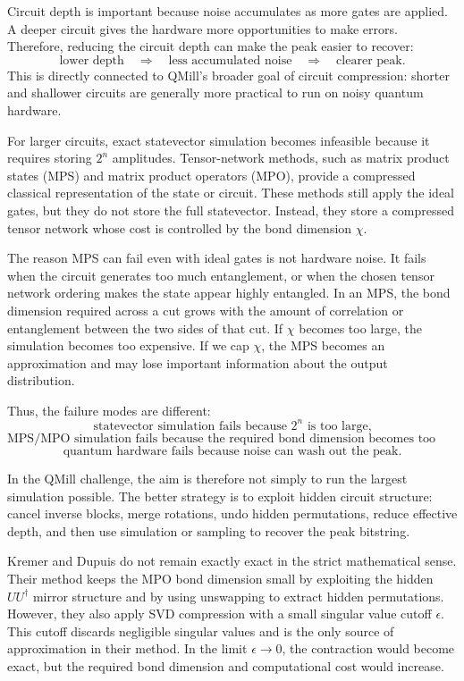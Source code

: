 Circuit depth is important because noise accumulates as more gates are applied.
A deeper circuit gives the hardware more opportunities to make errors. Therefore,
reducing the circuit depth can make the peak easier to recover:
\[
\text{lower depth}
\quad \Rightarrow \quad
\text{less accumulated noise}
\quad \Rightarrow \quad
\text{clearer peak}.
\]
This is directly connected to QMill's broader goal of circuit compression:
shorter and shallower circuits are generally more practical to run on noisy
quantum hardware.

For larger circuits, exact statevector simulation becomes infeasible because it
requires storing \(2^n\) amplitudes. Tensor-network methods, such as matrix
product states (MPS) and matrix product operators (MPO), provide a compressed
classical representation of the state or circuit. These methods still apply the
ideal gates, but they do not store the full statevector. Instead, they store a
compressed tensor network whose cost is controlled by the bond dimension
\(\chi\).

The reason MPS can fail even with ideal gates is not hardware noise. It fails
when the circuit generates too much entanglement, or when the chosen tensor
network ordering makes the state appear highly entangled. In an MPS, the bond
dimension required across a cut grows with the amount of correlation or
entanglement between the two sides of that cut. If \(\chi\) becomes too large,
the simulation becomes too expensive. If we cap \(\chi\), the MPS becomes an
approximation and may lose important information about the output distribution.

Thus, the failure modes are different:
\[
\text{statevector simulation fails because } 2^n \text{ is too large,}
\]
\[
\text{MPS/MPO simulation fails because the required bond dimension becomes too large,}
\]
\[
\text{quantum hardware fails because noise can wash out the peak.}
\]

In the QMill challenge, the aim is therefore not simply to run the largest
simulation possible. The better strategy is to exploit hidden circuit structure:
cancel inverse blocks, merge rotations, undo hidden permutations, reduce
effective depth, and then use simulation or sampling to recover the peak
bitstring.


Kremer and Dupuis do not remain exactly exact in the strict mathematical sense.
Their method keeps the MPO bond dimension small by exploiting the hidden
\(UU^\dagger\) mirror structure and by using unswapping to extract hidden
permutations. However, they also apply SVD compression with a small singular
value cutoff \(\epsilon\). This cutoff discards negligible singular values and is
the only source of approximation in their method. In the limit
\(\epsilon \to 0\), the contraction would become exact, but the required bond
dimension and computational cost would increase.

